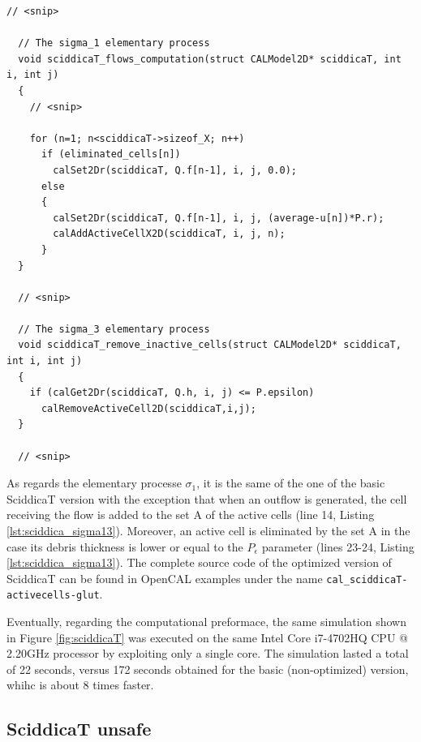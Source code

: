 \begin{lstlisting}[float,floatplacement=H, label=lst:sciddica_sigma13, caption=The $\sigma_1$ and $\sigma_3$ SciddicaT elementary processes with active cells optimization.]
  // <snip>

  // The sigma_1 elementary process
  void sciddicaT_flows_computation(struct CALModel2D* sciddicaT, int i, int j)
  {
    // <snip>
    
    for (n=1; n<sciddicaT->sizeof_X; n++)
      if (eliminated_cells[n])
        calSet2Dr(sciddicaT, Q.f[n-1], i, j, 0.0);
      else
      {
        calSet2Dr(sciddicaT, Q.f[n-1], i, j, (average-u[n])*P.r);
        calAddActiveCellX2D(sciddicaT, i, j, n);
      }
  }

  // <snip>
  
  // The sigma_3 elementary process
  void sciddicaT_remove_inactive_cells(struct CALModel2D* sciddicaT, int i, int j)
  {
    if (calGet2Dr(sciddicaT, Q.h, i, j) <= P.epsilon)
      calRemoveActiveCell2D(sciddicaT,i,j);
  }

  // <snip>
\end{lstlisting}

As regards the elementary processe $\sigma_1$, it is the same of the
one of the basic SciddicaT version with the exception that when an
outflow is generated, the cell receiving the flow is added to the set
A of the active cells (line 14, Listing
\ref{lst:sciddica_sigma13}). Moreover, an active cell is eliminated by
the set A in the case its debris thickness is lower or equal to the
$P_\epsilon$ parameter (lines 23-24, Listing
\ref{lst:sciddica_sigma13}). The complete source code of the optimized
version of SciddicaT can be found in OpenCAL examples under the name
\verb'cal_sciddicaT-activecells-glut'.

Eventually, regarding the computational preformace, the same
simulation shown in Figure \ref{fig:sciddicaT} was executed on the
same Intel Core i7-4702HQ CPU @ 2.20GHz processor by exploiting only a
single core. The simulation lasted a total of 22 seconds, versus 172
seconds obtained for the basic (non-optimized) version, whihc is about
8 times faster.

\subsection{SciddicaT unsafe}

